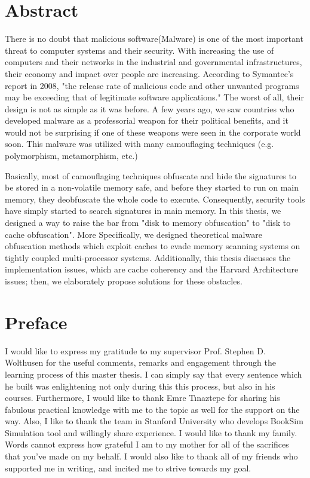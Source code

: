 \documentclass[medieteknikk]{gucmasterthesis}
\begin{document}
	\thesisdate{\gucmasterthesisdate}
\makefrontpages %
\thesistitlepage %


\chapter*{Abstract}

There is no doubt that malicious software(Malware) is one of the most important threat to computer systems and their security. With increasing the use of computers and their networks in the industrial and governmental infrastructures, their economy and impact over people are increasing. According to Symantec's report in 2008\cite{turner2008symantec}, "the release rate of malicious code and other unwanted programs may be exceeding that of legitimate software applications." The worst of all, their design is not as simple as it was before. A few years ago, we saw countries who developed malware as a professorial weapon for their political benefits, and it would not be surprising if one of these weapons were seen in the corporate world soon. This malware was utilized with many camouflaging techniques (e.g. polymorphism, metamorphism, etc.)

Basically, most of camouflaging techniques obfuscate and hide the signatures to be stored in a non-volatile memory safe, and before they started to run on main memory, they deobfuscate the whole code to execute.  Consequently, security tools have simply started to search signatures in main memory. In this thesis, we designed a way to raise the bar from "disk to memory obfuscation" to "disk to cache obfuscation". More Specifically, we designed theoretical malware obfuscation methods which exploit caches to evade memory scanning systems on tightly coupled multi-processor systems. Additionally, this thesis discusses the implementation issues, which are cache coherency and the Harvard Architecture issues; then, we elaborately propose solutions for these obstacles.

\chapter*{Preface}

I would like to express my gratitude to my supervisor Prof. Stephen D. Wolthusen for the useful comments, remarks and engagement through the learning process of this master thesis. I can simply say that every sentence which he built was enlightening not only during this this process, but also in his courses. Furthermore, I would like to thank Emre Tınaztepe for sharing his fabulous practical knowledge with me to the topic as well for the support on the way. Also, I like to thank the team in Stanford University who develops BookSim Simulation tool and willingly share experience. I would like to thank my family.  Words cannot express how grateful I am to my mother for all of the sacrifices that you've made on my behalf. I would also like to thank all of my friends who supported me in writing, and incited me to strive towards my goal.
\end{document}
